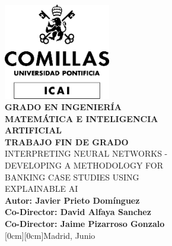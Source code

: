 \documentclass[12pt]{extarticle}
\numberwithin{equation}{section}
\begin{document}
\begin{titlepage}
    \centering
    \includegraphics[width=0.35\textwidth]{images/Logo_comillas.png}\\[1cm] 
    {\Huge \textbf{GRADO EN INGENIERÍA}}\\[0.3cm]
    {\Huge \textbf{MATEMÁTICA E INTELIGENCIA}}\\[0.5cm]
    {\Huge \textbf{ARTIFICIAL}}\\[1.5cm]
    {\Huge \textbf{TRABAJO FIN DE GRADO}}\\[1.3cm]
    {\huge INTERPRETING NEURAL NETWORKS -}\\[0.4cm]
    {\huge DEVELOPING A METHODOLOGY FOR }\\[0.4cm]
    {\huge BANKING CASE STUDIES USING }\\[0.4cm]
    {\huge EXPLAINABLE AI}\\[0.4cm]
    \textbf{Autor: Javier Prieto Domínguez}\\[0.5cm]
    \textbf{Co-Director: David Alfaya Sanchez}\\[0.5cm]
    \textbf{Co-Director: Jaime Pizarroso Gonzalo}\\
    \raisebox {-2cm}[0cm][0cm]{\large Madrid, Junio}
    \vfill
\end{titlepage}

\setlength{\headheight}{2cm}  %

\pagestyle{fancy}
\fancyhf{}

\end{document}
